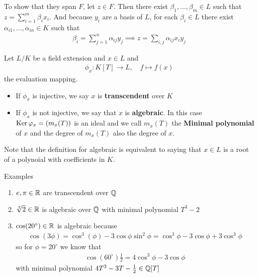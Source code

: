 To show that they span $F$, let $z \in F$. Then there exist $\beta_{1}, \ldots, \beta_{m} \in L$ such that $z = \sum_{i = 1}^{m}\beta_{i}x_i$. And because $y_i$ are a basis of $L$, for each $\beta_i \in L$ there exist $\alpha_{i1}, \ldots, \alpha_{in} \in K$ such that
\begin{align*}
	\beta_i = \sum_{j=1}^{n}\alpha_{ij}y_j \implies z = \sum_{i,j}\alpha_{ij} x_iy_j
\end{align*}



\begin{definition}[]
	Let $L/K$ be a field extension and $x \in L$ and 
	\begin{align*}
		\phi_x: K[T] \to L, \quad f \mapsto f(x)
	\end{align*}
	the evaluation mapping. 
	\begin{itemize}
		\item If $\phi_x$ is injective, we say $x$ is \textbf{transcendent} over $K$
		\item If $\phi_x$ is not injective, we say that $x$ is \textbf{algebraic}. In this case $\operatorname{Ker} \varphi_x = (m_x(T))$ is an ideal and we call $m_x(T)$ the \textbf{Minimal polynomial} of $x$ and the degree of $m_x(T)$ also the degree of $x$.
	\end{itemize}
\end{definition}
Note that the definition for algebraic is equivalent to saying that $x \in L$ is a root of a polynoial with coefficients in $K$.

Examples
\begin{enumerate}
	\item $e, \pi \in \mathbb{R}$ are transcendent over $\mathbb{Q}$
\item $\sqrt[3]{2} \in \mathbb{R}$ is algebraic over $\mathbb{Q}$ with minimal polynomial $T^3 - 2$
\item $\cos(20^{\circ}) \in \mathbb{R}$ is algebraic because
	\begin{align*}
		\cos(3 \phi) = \cos^3(\phi) - 3 \cos \phi \sin^2 \phi = \cos^3 \phi - 3 \cos \phi + 3 \cos^3 \phi
	\end{align*}
	so for $\phi = 20^{\circ}$ we know that
	\begin{align*}
	\cos(60^{\circ}) \frac{1}{2} = 4 \cos^3 \phi - 3 \cos \phi
 	\end{align*}
	with minimal polynomial $4T^3 - 3T - \frac{1}{2} \in \mathbb{Q}[T]$
\end{enumerate}



